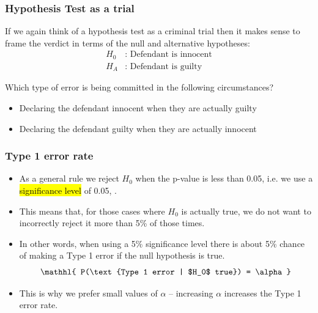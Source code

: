 
\begin{frame}[shrink]
\frametitle{Hypothesis Test as a trial}

If we again think of a hypothesis test as a criminal trial then it makes sense to frame the verdict in terms of the null and alternative hypotheses:
\begin{align*}
H_0&:\text{ Defendant is innocent} \\
H_A&:\text{ Defendant is guilty}
\end{align*}

Which type of error is being committed in the following circumstances?

\begin{itemize}
\item Declaring the defendant innocent when they are actually guilty
\item Declaring the defendant guilty when they are actually innocent
\end{itemize}

\end{frame}


\begin{frame}
\frametitle{Type 1 error rate}

\begin{itemize}

\item As a general rule we reject $H_0$ when the p-value is less than 0.05, i.e. we use a \hl{significance level} of 0.05, .

\pause

\item This means that, for those cases where $H_0$ is actually true, we do not want to incorrectly reject it more than 5\% of those times. 

\pause

\item In other words, when using a 5\% significance level there is about 5\% chance of making a Type 1 error if the null hypothesis is true.
\[ \mathhl{ P(\text{Type 1 error | $H_0$ true}) = \alpha } \]

\pause

\item This is why we prefer small values of $\alpha$ -- increasing $\alpha$ increases the Type 1 error rate.

\end{itemize}

\end{frame}

